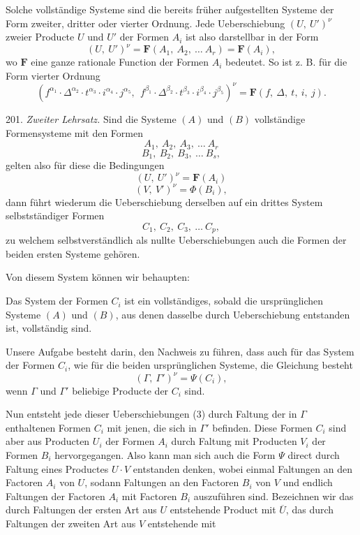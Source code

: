 \documentclass[11pt]{article}
\providecommand{\weberpage}[1]{}
\providecommand{\weq}[2]{\begin{equation}\tag{#1}#2\end{equation}}
\let\Gamma\varGamma
\let\Delta\varDelta
\let\Phi\varPhi
\let\Psi\varPsi
\begin{document}
\weberpage{225}
Solche vollständige Systeme sind die bereits früher aufgestellten
Systeme der Form zweiter, dritter oder vierter Ordnung. Jede
Ueberschiebung $(U,\ U')^\nu$ zweier Producte $U$ und $U'$ der Formen
$A_i$ ist also darstellbar in der Form
\[ (U,\ U')^\nu = \boldsymbol{F}(A_1,\ A_2,\ \ldots\ A_r) = \boldsymbol{F}(A_i), \]
wo $\boldsymbol{F}$ eine ganze rationale Function der Formen $A_i$ bedeutet. So ist
z. B. für die Form vierter Ordnung
\[ (f^{\alpha_1}\cdot \Delta^{\alpha_2}\cdot t^{\alpha_3}\cdot i^{\alpha_4}\cdot j^{\alpha_5},\ \ f^{\beta_1}\cdot \Delta^{\beta_2}\cdot t^{\beta_3}\cdot i^{\beta_4}\cdot j^{\beta_5})^\nu = \boldsymbol{F}(f,\ \Delta,\ t,\ i,\ j). \]

201. \textit{Zweiter Lehrsatz.} Sind die Systeme $(A)$ und $(B)$
vollständige Formensysteme mit den Formen
\weq{I}{ A_1,\ A_2,\ A_3,\ \ldots\ A_r }
\weq{II}{ B_1,\ B_2,\ B_3,\ \ldots\ B_s, }
gelten also für diese die Bedingungen
\weq{1}{ (U,\ U')^\nu = \boldsymbol{F}(A_i) }
\weq{2}{ (V,\ V')^\nu = \boldsymbol{\Phi}(B_i), }
dann führt wiederum die Ueberschiebung derselben auf ein drittes
System selbstständiger Formen
\weq{III}{ C_1,\ C_2,\ C_3,\ \ldots\ C_p, }
zu welchem selbstverständlich als nullte Ueberschiebungen auch die
Formen der beiden ersten Systeme gehören.

Von diesem System können wir behaupten:

\glqq Das System der Formen $C_i$ ist ein vollständiges, sobald die
ursprünglichen Systeme $(A)$ und $(B)$, aus denen dasselbe durch
Ueberschiebung entstanden ist, vollständig sind.\grqq{}

Unsere Aufgabe besteht darin, den Nachweis zu führen, dass auch
für das System der Formen $C_i$, wie für die beiden ursprünglichen
Systeme, die Gleichung besteht
\weq{3}{ (\Gamma,\ \Gamma')^\nu = \boldsymbol{\Psi}(C_i), }
wenn $\Gamma$ und $\Gamma'$ beliebige Producte der $C_i$ sind.

Nun entsteht jede dieser Ueberschiebungen (3) durch Faltung der
in $\Gamma$ enthaltenen Formen $C_i$ mit jenen, die sich in $\Gamma'$
befinden. Diese Formen $C_i$ sind aber aus Producten $U_i$ der Formen
$A_i$ durch Faltung mit Producten $V_i$ der Formen $B_i$ hervorgegangen.
Also kann man sich auch die Form $\boldsymbol{\Psi}$ direct durch Faltung eines
Productes $U\cdot V$ entstanden denken, wobei einmal Faltungen an den
Factoren $A_i$ von $U$, sodann Faltungen an den Factoren $B_i$ von $V$
und endlich Faltungen der Factoren $A_i$ mit Factoren $B_i$ auszuführen
sind. Bezeichnen wir das durch Faltungen der ersten Art aus $U$
entstehende Product mit $\overline U$, das durch Faltungen der zweiten
Art aus $V$ entstehende mit
\end{document}
